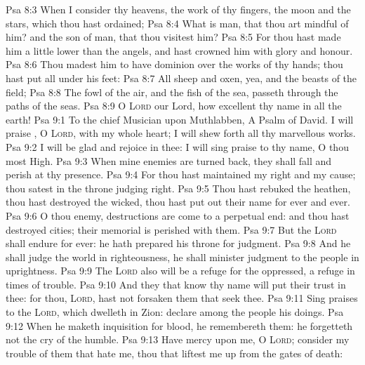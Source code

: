 \vs Psa 8:3 When I consider thy heavens, the work of thy fingers, the moon and the stars, which thou hast ordained;
\vs Psa 8:4 What is man, that thou art mindful of him? and the son of man, that thou visitest him?
\vs Psa 8:5 For thou hast made him a little lower than the angels, and hast crowned him with glory and honour.
\vs Psa 8:6 Thou madest him to have dominion over the works of thy hands; thou hast put all  under his feet:
\vs Psa 8:7 All sheep and oxen, yea, and the beasts of the field;
\vs Psa 8:8 The fowl of the air, and the fish of the sea,  passeth through the paths of the seas.
\vs Psa 8:9 O \textsc{Lord} our Lord, how excellent  thy name in all the earth!
\vs Psa 9:1 To the chief Musician upon Muthlabben, A Psalm of David. I will praise , O \textsc{Lord}, with my whole heart; I will shew forth all thy marvellous works.
\vs Psa 9:2 I will be glad and rejoice in thee: I will sing praise to thy name, O thou most High.
\vs Psa 9:3 When mine enemies are turned back, they shall fall and perish at thy presence.
\vs Psa 9:4 For thou hast maintained my right and my cause; thou satest in the throne judging right.
\vs Psa 9:5 Thou hast rebuked the heathen, thou hast destroyed the wicked, thou hast put out their name for ever and ever.
\vs Psa 9:6 O thou enemy, destructions are come to a perpetual end: and thou hast destroyed cities; their memorial is perished with them.
\vs Psa 9:7 But the \textsc{Lord} shall endure for ever: he hath prepared his throne for judgment.
\vs Psa 9:8 And he shall judge the world in righteousness, he shall minister judgment to the people in uprightness.
\vs Psa 9:9 The \textsc{Lord} also will be a refuge for the oppressed, a refuge in times of trouble.
\vs Psa 9:10 And they that know thy name will put their trust in thee: for thou, \textsc{Lord}, hast not forsaken them that seek thee.
\vs Psa 9:11 Sing praises to the \textsc{Lord}, which dwelleth in Zion: declare among the people his doings.
\vs Psa 9:12 When he maketh inquisition for blood, he remembereth them: he forgetteth not the cry of the humble.
\vs Psa 9:13 Have mercy upon me, O \textsc{Lord}; consider my trouble  of them that hate me, thou that liftest me up from the gates of death:
